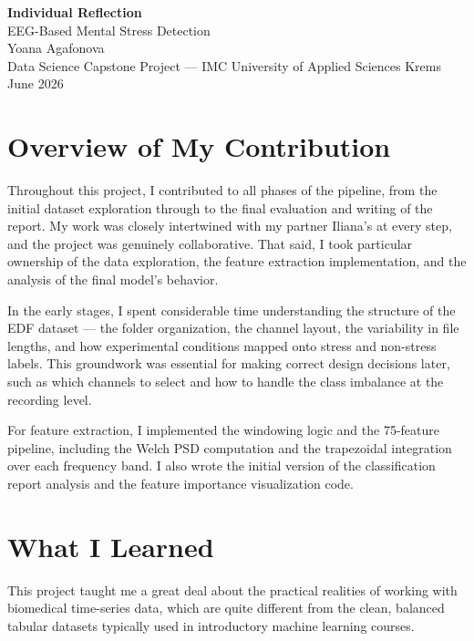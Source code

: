 \documentclass[12pt,a4paper]{article}
\begin{document}
\begin{center}
	{\Large \textbf{Individual Reflection}}\\[0.4em]
	{\large EEG-Based Mental Stress Detection}\\[0.3em]
	{\normalsize Yoana Agafonova}\\[0.2em]
	{\normalsize Data Science Capstone Project --- IMC University of Applied Sciences Krems}\\[0.2em]
	{\normalsize June 2026}
\end{center}

\vspace{1em}

\section*{Overview of My Contribution}

Throughout this project, I contributed to all phases of the pipeline, from the initial dataset exploration through to the final evaluation and writing of the report. My work was closely intertwined with my partner Iliana's at every step, and the project was genuinely collaborative. That said, I took particular ownership of the data exploration, the feature extraction implementation, and the analysis of the final model's behavior.

In the early stages, I spent considerable time understanding the structure of the EDF dataset --- the folder organization, the channel layout, the variability in file lengths, and how experimental conditions mapped onto stress and non-stress labels. This groundwork was essential for making correct design decisions later, such as which channels to select and how to handle the class imbalance at the recording level.

For feature extraction, I implemented the windowing logic and the 75-feature pipeline, including the Welch PSD computation and the trapezoidal integration over each frequency band. I also wrote the initial version of the classification report analysis and the feature importance visualization code.

\section*{What I Learned}

This project taught me a great deal about the practical realities of working with biomedical time-series data, which are quite different from the clean, balanced tabular datasets typically used in introductory machine learning courses.
\end{document}
